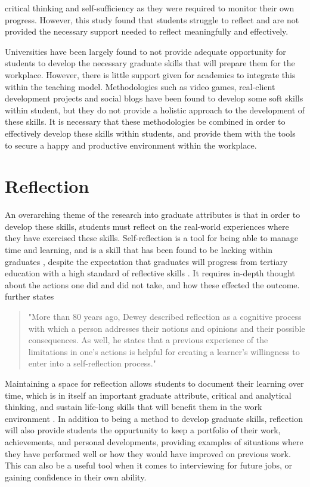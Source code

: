 \documentclass{l4proj}
\begin{document}
critical thinking and self-sufficiency as they were required to monitor their own progress. 
However, this study found that students struggle to reflect and are not provided the necessary 
support needed to reflect meaningfully and effectively. 
\par 
Universities have been largely found to not provide adequate opportunity for students to 
develop the necessary graduate skills that will prepare them for the workplace. However, there is 
little support given for academics to integrate this within the teaching model. Methodologies such 
as video games, real-client development projects and social blogs have been found to develop some 
soft skills within student, but they do not provide a holistic approach to the development of 
these skills. It is necessary that these methodologies be combined in order to effectively 
develop these skills within students, and provide them with the tools to secure a happy and 
productive environment within the workplace.

\section{Reflection}

An overarching theme of the research into graduate attributes is that in order to develop these skills, students must reflect on the real-world 
experiences where they have exercised these skills. Self-reflection is a tool for being able to manage time and learning, and is a skill that has
been found to be lacking within graduates \citep{thurner_development_2020}, despite the expectation that graduates will progress from tertiary 
education with a high standard of reflective skills \citep{bruno_reflective_2018}. It requires in-depth thought about the actions one did and did 
not take, and how these effected the outcome. \citet{thurner_development_2020} further states 
\begin{quotation}
    "More than 80 years ago, Dewey described reflection as a cognitive process with which a person addresses their notions and opinions and their 
    possible consequences. As well, he states that a previous experience of the limitations in one’s actions is helpful for creating a learner’s 
    willingness to enter into a self-reflection process."
\end{quotation}
Maintaining a space for reflection allows students to document their learning over time, which 
is in itself an important graduate attribute, critical and analytical thinking, and sustain life-long skills that will benefit them in the work
environment \citep{mcdermott_developing_nodate}.  In addition to being a method to develop graduate skills, reflection will also provide students 
the oppurtunity to keep a portfolio of their work, achievements, and personal developments, providing examples of situations where they have performed
well or how they would have improved on previous work. This can also be a useful tool when it comes to interviewing for future jobs, or gaining 
confidence in their own ability. 
\end{document}
